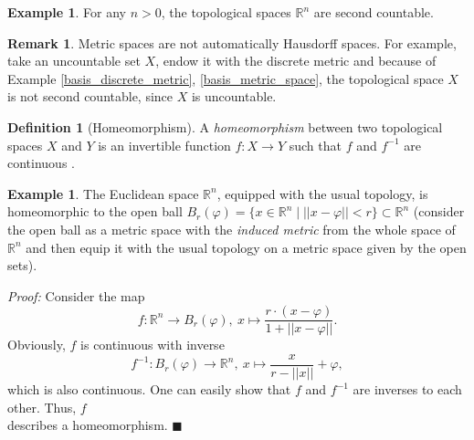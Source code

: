 \documentclass[12pt, a4paper]{article}
\numberwithin{equation}{section}
\theoremstyle{definition}
\theoremstyle{definition}
\newtheorem{defn}[thm]{Definition} %
\newtheorem{exmp}[thm]{Example} %
\newtheorem{remark}[thm]{Remark} %
\begin{document}
	\begin{exmp}
		For any $n > 0$, the topological spaces $\mathbb R^n$ are second countable. 
	\end{exmp}
	
	\begin{remark}
		Metric spaces are not automatically Hausdorff spaces. For example, take an uncountable set $X$, endow it with the discrete metric and because of Example \ref{basis_discrete_metric}, \ref{basis_metric_space},  the topological space $X$ is not second countable, since $X$ is uncountable. 
	\end{remark}
	
	\begin{defn}[Homeomorphism] A \textit{homeomorphism} between two topological spaces $X$ and $Y$ is an invertible function $f: X\rightarrow Y$ such that $f$ and $f^{-1}$ are continuous \cite[p. 33]{topology-singh}. 
	\end{defn}

	\begin{exmp}
		The Euclidean space $\mathbb R^n$, equipped with the usual topology, is homeomorphic to the open ball $B_{r}(\varphi) =  \{x\in\mathbb R^n \mid \lvert\lvert x-\varphi \rvert\rvert < r \} \subset \mathbb R^n$ (consider the open ball as a metric space with the \textit{induced metric} from the whole space of $\mathbb R^n$ and then equip it with the usual topology on a metric space given by the open sets). 
	\end{exmp}
	\noindent\textit{Proof:} Consider the map $$f: \mathbb R^n\rightarrow B_r(\varphi), \ x\mapsto \frac{r\cdot (x-\varphi)}{1+\lvert\lvert x-\varphi\rvert\rvert}.$$ Obviously, $f$ is continuous with inverse $$f^{-1}: B_r(\varphi)\rightarrow \mathbb R^n, \ x \mapsto \frac{x}{r-\lvert\lvert x\rvert\rvert}+\varphi,$$ which is also continuous. One can easily show that $f$ and $f^{-1}$ are inverses to each other. Thus, $f$ \\ describes a homeomorphism. 	\qquad\qquad\qquad\qquad\qquad\qquad\qquad\qquad\qquad\qquad\qquad\qquad\qquad\qquad\qquad$\blacksquare$
	
\end{document}
